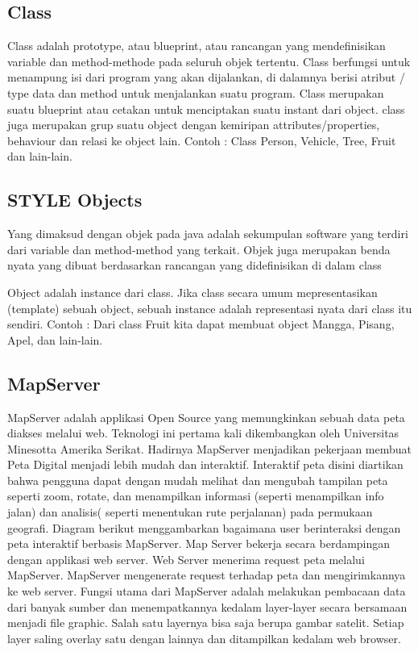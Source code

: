 \subsection{Class}
Class adalah prototype, atau blueprint, atau rancangan yang mendefinisikan variable dan method-methode pada seluruh objek tertentu. 
Class berfungsi untuk menampung isi dari program yang akan dijalankan, di dalamnya berisi atribut / type data dan method untuk menjalankan suatu program.
Class merupakan suatu blueprint atau cetakan untuk menciptakan suatu instant dari  object. 
class juga merupakan grup suatu object dengan kemiripan attributes/properties, behaviour dan relasi ke object lain. 
Contoh : Class Person, Vehicle, Tree, Fruit dan lain-lain.

\subsection{STYLE Objects}
Yang dimaksud dengan objek pada java adalah sekumpulan software yang terdiri dari variable dan method-method yang terkait. 
Objek juga merupakan benda nyata yang dibuat berdasarkan rancangan yang didefinisikan di dalam class

Object adalah instance dari class. Jika class secara umum mepresentasikan (template) sebuah object, 
sebuah instance adalah representasi nyata dari class itu sendiri. Contoh : Dari class Fruit kita dapat membuat object Mangga, 
Pisang, Apel, dan lain-lain.

\subsection{MapServer}
MapServer adalah applikasi Open Source yang memungkinkan sebuah data peta diakses melalui web. Teknologi ini pertama kali dikembangkan oleh Universitas Minesotta Amerika Serikat. Hadirnya MapServer menjadikan pekerjaan membuat Peta Digital menjadi lebih mudah dan interaktif. Interaktif peta disini diartikan bahwa pengguna dapat dengan mudah melihat dan mengubah tampilan peta seperti zoom, rotate, dan menampilkan informasi (seperti menampilkan info jalan) dan analisis( seperti menentukan rute perjalanan) pada permukaan geografi. Diagram berikut menggambarkan bagaimana user berinteraksi dengan peta interaktif berbasis MapServer.
Map Server bekerja secara berdampingan dengan applikasi web server. Web Server menerima request peta melalui MapServer. MapServer mengenerate request terhadap peta dan mengirimkannya ke web server. Fungsi utama dari MapServer adalah melakukan pembacaan data dari banyak sumber dan menempatkannya kedalam layer-layer secara bersamaan menjadi file graphic. Salah satu layernya bisa saja berupa gambar satelit. Setiap layer saling overlay satu dengan lainnya dan ditampilkan kedalam web browser.

